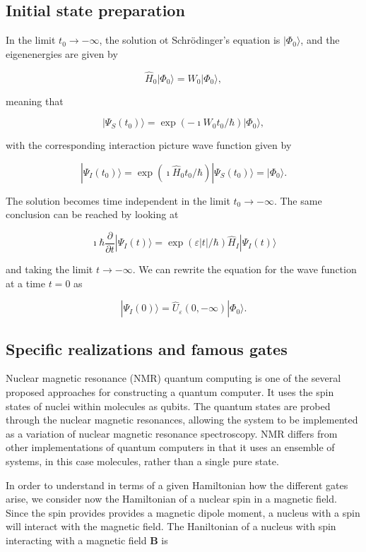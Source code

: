 \subsection{Initial state preparation}

In the limit $t_0\rightarrow -\infty$, the solution ot Schrödinger's equation is
$|\Phi_0\rangle$, and the eigenenergies are given by 

\[
\hat{H}_0|\Phi_0\rangle=W_0|\Phi_0\rangle,
\]

meaning that 

\[
|\Psi_S(t_0)\rangle = \exp{(-\imath W_0t_0/\hbar)}|\Phi_0\rangle,
\]

with the corresponding interaction picture wave function given by

\[
|\Psi_I(t_0)\rangle = \exp{(\imath \hat{H}_0t_0/\hbar)}|\Psi_S(t_0)\rangle=|\Phi_0\rangle.
\]



The solution becomes time independent in the limit $t_0\rightarrow -\infty$.
The same conclusion can be reached by looking at 

\[
\imath \hbar\frac{\partial }{\partial t}|\Psi_I(t)\rangle =
\exp{(\varepsilon |t|/\hbar)}\hat{H}_I|\Psi_I(t)\rangle 
\]

and taking the limit $t\rightarrow -\infty$.
We can rewrite the equation for the wave function at a time $t=0$ as

\[
|\Psi_I(0) \rangle = \hat{U}_{\varepsilon}(0,-\infty)|\Phi_0\rangle.
\]


\subsection{Specific realizations and famous gates}

Nuclear magnetic resonance (NMR) quantum computing is one of the several
proposed approaches for constructing a quantum computer. It uses the
spin states of nuclei within molecules as qubits. The quantum states
are probed through the nuclear magnetic resonances, allowing the
system to be implemented as a variation of nuclear magnetic resonance
spectroscopy. NMR differs from other implementations of quantum
computers in that it uses an ensemble of systems, in this case
molecules, rather than a single pure state.

In order to understand in terms of a given Hamiltonian how the
different gates arise, we consider now the Hamiltonian of a nuclear
spin in a magnetic field. Since the spin provides provides a magnetic
dipole moment, a nucleus with a spin will interact with the magnetic
field. The Haniltonian of a nucleus with spin interacting with a
magnetic field $\bm{B}$ is


